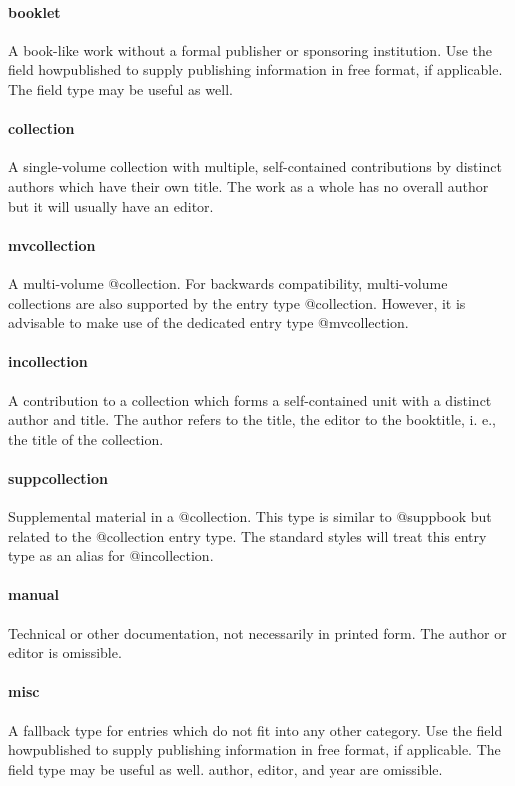 \documentclass[a4paper,12pt]{report}
\begin{document}
\paragraph{booklet} 
A book-like work without a formal publisher or sponsoring institution. Use the field
howpublished to supply publishing information in free format, if applicable. The field type
may be useful as well.

\paragraph{collection}
A single-volume collection with multiple, self-contained contributions by distinct authors
which have their own title. The work as a whole has no overall author but it will usually
have an editor.

\paragraph{mvcollection}
A multi-volume @collection. For backwards compatibility, multi-volume collections are
also supported by the entry type @collection. However, it is advisable to make use of the
dedicated entry type @mvcollection.

\paragraph{incollection}
A contribution to a collection which forms a self-contained unit with a distinct author
and title. The author refers to the title, the editor to the booktitle, i. e., the title of the
collection.

\paragraph{suppcollection}
Supplemental material in a @collection. This type is similar to @suppbook but related to
the @collection entry type. The standard styles will treat this entry type as an alias for
@incollection.

\paragraph{manual}
Technical or other documentation, not necessarily in printed form. The author or editor
is omissible.

\paragraph{misc}
A fallback type for entries which do not fit into any other category. Use the field
howpublished to supply publishing information in free format, if applicable. The field
type may be useful as well. author, editor, and year are omissible.
\end{document}
